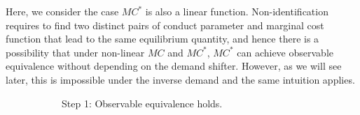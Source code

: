 \documentclass[11pt, a4paper]{article}
\theoremstyle{remark}
\begin{document}
Here, we consider the case $MC^{*}$ is also a linear function.
Non-identification requires to find two distinct pairs of conduct parameter and marginal cost function that lead to the same equilibrium quantity, and hence there is a possibility that under non-linear $MC$ and $MC^{*}$, $MC^{*}$ can achieve observable equivalence without depending on the demand shifter.
However, as we will see later, this is impossible under the inverse demand and the same intuition applies.

\begin{figure}[p!]
    \begin{center}
        \begin{subfigure}[b]{0.45\textwidth}
            \centering
            \caption{Step 1: Observable equivalence holds.}
            \label{fig:identification_example_step_1}
        \end{subfigure}
        \hfill
        \begin{subfigure}[b]{0.45\textwidth}
            \centering
\end{subfigure}
\end{center}
\end{figure}
\end{document}

